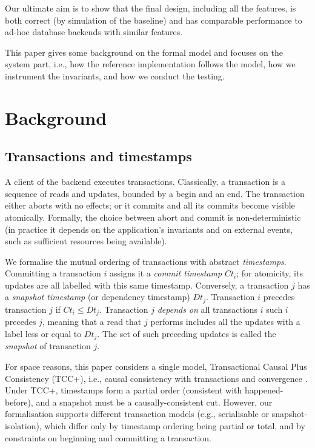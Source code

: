 \documentclass[systeme,french,english]{compas2022}
\begin{document}
Our ultimate aim is to show that the final design, including all the
features, is both correct (by simulation of the baseline) and has
comparable performance to ad-hoc database backends with similar features.

This paper gives some background on the formal model and focuses on the
system part, i.e., how the reference implementation follows the model,
how we instrument the invariants, and how we conduct the testing.

\section{Background}
\label{sec:background}

\subsection{Transactions and timestamps}
\label{sec:transactions}

A client of the backend executes transactions.
Classically, a transaction is a sequence of reads and updates, bounded by
a begin and an end.
The transaction either aborts with no effects; or it commits and all its
commits become visible atomically.
Formally, the choice between abort and commit is non-deterministic (in
practice it depends on the application's invariants and on external
events, such as sufficient resources being available).

We formalise the mutual ordering of transactions with abstract
\emph{timestamps}.
Committing a transaction $i$ assigns it a \emph{commit timestamp}
$\mathit{Ct}_{i}$; for atomicity, its updates are all labelled
with this same timestamp.
Conversely, a transaction $j$  has a \emph{snapshot timestamp} (or dependency
timestamp) $\mathit{Dt}_{j}$.
Transaction $i$ precedes transaction $j$ if $\mathit{Ct}_{i} \le
\mathit{Dt}_{j}$.
Transaction $j$ \emph{depends on} all transactions $i$ such $i$ precedes
$j$, meaning that a read that $j$ performs includes all the updates with
a label less or equal to $\mathit{Dt}_{j}$.
The set of such preceding updates is called the \emph{snapshot} of
transaction $j$.
 
For space reasons, this paper considers a single model, Transactional
Causal Plus Consistency (TCC+), i.e., causal consistency with
transactions and convergence \cite{rep:syn:sh228,rep:pro:sh182}.
Under TCC+, timestamps form a partial order (consistent with
happened-before), and a snapshot must be a causally-consistent cut.
However, our formalisation supports different transaction models (e.g.,
serialisable or snapshot-isolation), which differ only by timestamp
ordering being partial or total, and by constraints on beginning and
committing a transaction.
\end{document}
